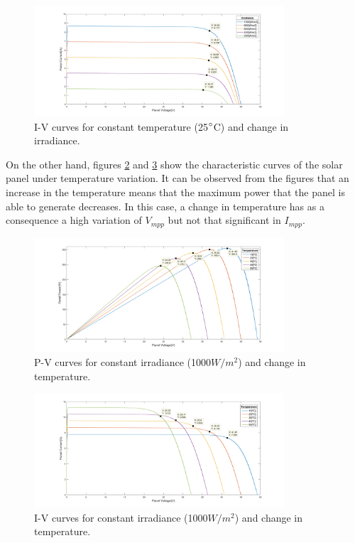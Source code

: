 \begin{figure}[H]
	\begin{center}
		\includegraphics[width=0.83\textwidth]{../Pictures/IV_curves_T25degrees}
		\caption{I-V curves for constant temperature (25$\dec$C) and change in irradiance.}
		\label{fig:IVcurves_T25} 
	\end{center}	
\end{figure}

On the other hand, figures \ref{fig:PVcurves_Irr1000} and \ref{fig:IVcurves_Irr1000} show the characteristic curves of the solar panel under temperature variation. It can be observed from the figures that an increase in the temperature means that the maximum power that the panel is able to generate decreases. In this case, a change in temperature has as a consequence a high variation of $V_{mpp}$ but not that significant in $I_{mpp}$.


\begin{figure}[H]
	\begin{center}
		\includegraphics[width=0.83\textwidth]{../Pictures/PV_curves_1000_irradiance}
		\caption{P-V curves for constant irradiance (1000$W/ m^2$) and change in temperature.}
		\label{fig:PVcurves_Irr1000} 
	\end{center}	
\end{figure}


\begin{figure}[H]
	\begin{center}
		\includegraphics[width=0.83\textwidth]{../Pictures/IV_curves_1000_irradiance}
		\caption{I-V curves for constant irradiance (1000$W/ m^2$) and change in temperature.}
		\label{fig:IVcurves_Irr1000} 
	\end{center}	
\end{figure}



